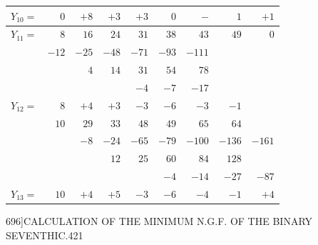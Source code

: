 \documentclass[11pt]{article}
\begin{document}
\begin{center}
\begin{tabular}{l|rrrrrrrr}
$Y_{10}=$ & $0$     & $+8$    & $+3$    & $+3$    & $0$     & $-$       & $1$       & $+1$ \\\hline
$Y_{11}=$ & $8$     & $16$    & $24$    & $31$    & $38$    & $43$      & $49$      & $0$  \\
          & $-12$   & $-25$   & $-48$   & $-71$   & $-93$   & $-111$    &           &      \\
          &         & $4$     & $14$    & $31$    & $54$    & $78$      &           &      \\
          &         &         &         & $-4$    & $-7$    & $-17$     &           &      \\\hline
$Y_{12}=$ & $8$     & $+4$    & $+3$    & $-3$    & $-6$    & $-3$      & $-1$      &      \\
          & $10$    & $29$    & $33$    & $48$    & $49$    & $65$      & $64$      &      \\
          &         & $-8$    & $-24$   & $-65$   & $-79$   & $-100$    & $-136$    & $-161$\\
          &         &         & $12$    & $25$    & $60$    & $84$      & $128$     &      \\
          &         &         &         &         & $-4$    & $-14$     & $-27$     & $-87$\\\hline
$Y_{13}=$ & $10$    & $+4$    & $+5$    & $-3$    & $-6$    & $-4$      & $-1$      & $+4$ \\
\end{tabular}
\end{center}

\clearpage
\begin{center}\small 696]\hfill CALCULATION OF THE MINIMUM N.G.F. OF THE BINARY SEVENTHIC.\hfill 421\end{center}
\end{document}
